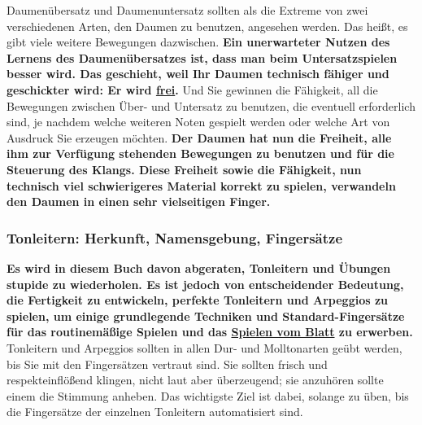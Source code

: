 Daumenübersatz und Daumenuntersatz sollten als die Extreme von zwei verschiedenen Arten, den Daumen zu benutzen, angesehen werden.
Das heißt, es gibt viele weitere Bewegungen dazwischen.
\textbf{Ein unerwarteter Nutzen des Lernens des Daumenübersatzes ist, dass man beim Untersatzspielen besser wird.
Das geschieht, weil Ihr Daumen technisch fähiger und geschickter wird: Er wird \underline{frei}.}
Und Sie gewinnen die Fähigkeit, all die Bewegungen zwischen Über- und Untersatz zu benutzen, die eventuell erforderlich sind, je nachdem welche weiteren Noten gespielt werden oder welche Art von Ausdruck Sie erzeugen möchten.
\textbf{Der Daumen hat nun die Freiheit, alle ihm zur Verfügung stehenden Bewegungen zu benutzen und für die Steuerung des Klangs.
Diese Freiheit sowie die Fähigkeit, nun technisch viel schwierigeres Material korrekt zu spielen, verwandeln den Daumen in einen sehr vielseitigen Finger.}


\subsubsection{Tonleitern: Herkunft, Namensgebung, Fingersätze}
\label{c1iii5d}

\textbf{Es wird in diesem Buch davon abgeraten, Tonleitern und Übungen stupide zu wiederholen.
Es ist jedoch von entscheidender Bedeutung, die Fertigkeit zu entwickeln, perfekte Tonleitern und Arpeggios zu spielen, um einige grundlegende Techniken und Standard-Fingersätze für das routinemäßige Spielen und das \hyperref[c1iii11]{Spielen vom Blatt} zu erwerben.}
Tonleitern und Arpeggios sollten in allen Dur- und Molltonarten geübt werden, bis Sie mit den Fingersätzen vertraut sind.
Sie sollten frisch und respekteinflößend klingen, nicht laut aber überzeugend; sie anzuhören sollte einem die Stimmung anheben.
Das wichtigste Ziel ist dabei, solange zu üben, bis die Fingersätze der einzelnen Tonleitern automatisiert sind. 

